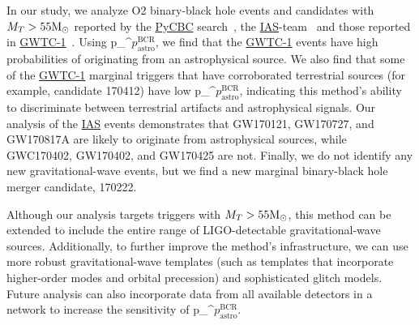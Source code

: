 \documentclass[%
 nofootinbib,
 amsmath,amssymb,
 aps,
 twocolumn,
 superscriptaddress
]{revtex4-2}
\newcommand{\pycbc}{{\sc \href{https://pycbc.org/}{{PyCBC}}}\xspace}
\newcommand{\GWTC}{{\sc \href{https://ui.adsabs.harvard.edu/abs/2019PhRvX...9c1040A/abstract}{{GWTC-1}}}\xspace}
\newcommand{\IAS}{{\sc \href{https://ui.adsabs.harvard.edu/abs/2020PhRvD.101h3030V/abstract}{{IAS}}}\xspace}
\newcommand{\fancytext}[1]{{\relax\ifmmode#1\else $#1$\fi}\xspace}
\newcommand{\mathcmd}[1]{{\sc \relax\ifmmode#1\else $#1$\fi}\xspace}
\newcommand{\msun}{\mathcmd{\text{M}_\odot}}
\newcommand{\pastrobcr}{\fancytext{p_\text{astro}^{\text{BCR}}}}
\newcommand{\avi}[1]{\textcolor{orange}{[AV: #1]}}
\newcommand{\greg}[1]{\textcolor{purple}{[Greg: #1]}}
\begin{document}
In our study, we analyze O2 binary-black hole events and candidates with $M_T > 55 \msun$ reported by the \pycbc search~\cite{pycbc_ogc_2}, the \IAS-team~\cite{IAS1, IAS2} and those reported in \GWTC~\cite{GWTC1}. Using \pastrobcr, we find that the \GWTC events have high probabilities of originating from an astrophysical source. We also find that some of the \GWTC marginal triggers that have corroborated terrestrial sources (for example, candidate 170412) have low \pastrobcr, indicating this method's ability to discriminate between terrestrial artifacts and astrophysical signals. Our analysis of the \IAS events demonstrates that GW170121, GW170727, and GW170817A are likely to originate from astrophysical sources, while GWC170402, GW170402, and GW170425  are not. Finally, we do not identify any new gravitational-wave events, but we find a new marginal binary-black hole merger candidate, 170222. 

Although our analysis targets triggers with $M_T > 55 \msun$, this method can be extended to include the entire range of LIGO-detectable gravitational-wave sources. Additionally, to further improve the method's infrastructure, we can use more robust gravitational-wave templates (such as templates that incorporate higher-order modes and orbital precession) and sophisticated glitch models. Future analysis can also incorporate data from all available detectors in a network to increase the sensitivity of \pastrobcr. 




\end{document}
